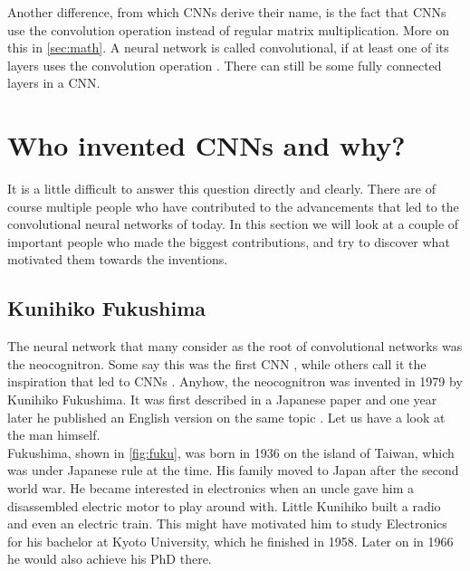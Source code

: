 \documentclass{article}
\begin{document}
Another difference, from which CNNs derive their name, is the fact that CNNs use the convolution operation instead of regular matrix multiplication. More on this in \autoref{sec:math}. A neural network is called convolutional, if at least one of its layers uses the convolution operation \cite[Ch. 9]{dl-book}. There can still be some fully connected layers in a CNN.\\










\section{Who invented CNNs and why?}

It is a little difficult to answer this question directly and clearly. There are of course multiple people who have contributed to the advancements that led to the convolutional neural networks of today. In this section we will look at a couple of important people who made the biggest contributions, and try to discover what motivated them towards the inventions.\\

\subsection{Kunihiko Fukushima}

The neural network that many consider as the root of convolutional networks was the neocognitron. Some say this was the first CNN \cite{sch, fuzzy}, while others call it the inspiration that led to CNNs \cite{dl-lecun, history}. Anyhow, the neocognitron was invented in 1979 by Kunihiko Fukushima. It was first described in a Japanese paper \cite{jap} and one year later he published an English version on the same topic \cite{neocog}. Let us have a look at the man himself.\\

Fukushima, shown in \autoref{fig:fuku}, was born in 1936 \cite{about-fuku} on the island of Taiwan, which was under Japanese rule at the time. His family moved to Japan after the second world war. He became interested in electronics when an uncle gave him a disassembled electric motor to play around with. Little Kunihiko built a radio and even an electric train. This might have motivated him to study Electronics for his bachelor at Kyoto University, which he finished in 1958. Later on in 1966 he would also achieve his PhD there.\\
\end{document}
